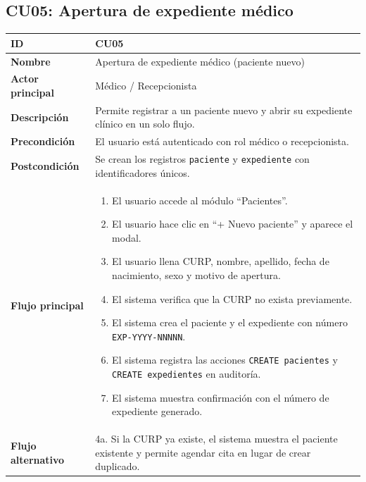 \documentclass[11pt,a4paper]{article}
\begin{document}
\subsection*{CU05: Apertura de expediente médico}
\begin{longtable}{|L{3.5cm}|L{10cm}|}
    \hline
    \textbf{ID}                & CU05                                                                                                                   \\ \hline
    \textbf{Nombre}            & Apertura de expediente médico (paciente nuevo)                                                                         \\ \hline
    \textbf{Actor principal}   & Médico / Recepcionista                                                                                                 \\ \hline
    \textbf{Descripción}       & Permite registrar a un paciente nuevo y abrir su expediente clínico en un solo flujo.                                  \\ \hline
    \textbf{Precondición}      & El usuario está autenticado con rol médico o recepcionista.                                                            \\ \hline
    \textbf{Postcondición}     & Se crean los registros \texttt{paciente} y \texttt{expediente} con identificadores únicos.                             \\ \hline
    \textbf{Flujo principal}   &
    \begin{enumerate}
        \item El usuario accede al módulo ``Pacientes''.
        \item El usuario hace clic en ``+ Nuevo paciente'' y aparece el modal.
        \item El usuario llena CURP, nombre, apellido, fecha de nacimiento, sexo y motivo de apertura.
        \item El sistema verifica que la CURP no exista previamente.
        \item El sistema crea el paciente y el expediente con número \texttt{EXP-YYYY-NNNNN}.
        \item El sistema registra las acciones \texttt{CREATE pacientes} y \texttt{CREATE expedientes} en auditoría.
        \item El sistema muestra confirmación con el número de expediente generado.
    \end{enumerate}                                     \\ \hline
    \textbf{Flujo alternativo} & 4a. Si la CURP ya existe, el sistema muestra el paciente existente y permite agendar cita en lugar de crear duplicado. \\ \hline
\end{longtable}
\end{document}
